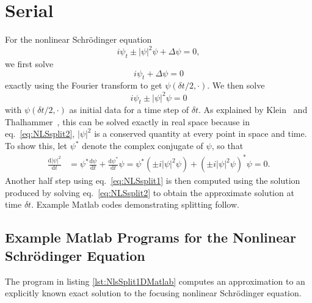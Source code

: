 \section{Serial}

For the nonlinear Schr\"{o}dinger equation
\begin{equation}
i\psi_t\pm\lvert\psi\rvert^2\psi+\Delta\psi=0, \label{eq:NLS}
\end{equation}
we first solve
\begin{equation}
i\psi_t+\Delta\psi=0 \label{eq:NLSsplit1}
\end{equation}
exactly using the Fourier transform to get $\psi(\delta{t}/2,\cdot)$. We then solve
\begin{equation}
i\psi_t\pm\lvert\psi\rvert^2\psi=0  \label{eq:NLSsplit2}
\end{equation}
with $\psi(\delta{t}/2,\cdot)$ as initial data for a time step of $\delta t$. As explained by Klein~\cite{Kle08} and Thalhammer~\cite{Tha08}, this can be solved exactly in real space because in eq.\ \eqref{eq:NLSsplit2}, $\lvert \psi \rvert^2$ is a conserved quantity at every point in space and time. To show this, let $\psi^*$ denote the complex conjugate of $\psi$, so that
\begin{align}
\frac{\mathrm{d}\lvert \psi \rvert^2}{\mathrm{d}t} &{} = \psi^*\frac{\mathrm{d}\psi}{\mathrm{d}t} +\frac{\mathrm{d}\psi^*}{\mathrm{d}t}\psi = \psi^*\left(\pm i\lvert\psi\rvert^2\psi\right)+\left(\pm i\lvert\psi\rvert^2\psi\right)^*\psi = 0.
\end{align}
Another half step using eq.\ \eqref{eq:NLSsplit1} is then computed using the solution produced by solving eq.\ \eqref{eq:NLSsplit2} to obtain the approximate solution at time $\delta t$.  Example Matlab codes demonstrating splitting follow.

\subsection{Example Matlab Programs for the Nonlinear Schr\"{o}dinger Equation}

The program in listing \ref{lst:NlsSplit1DMatlab} computes an approximation to an explicitly known exact solution to the focusing nonlinear Schr\"{o}dinger equation.   



